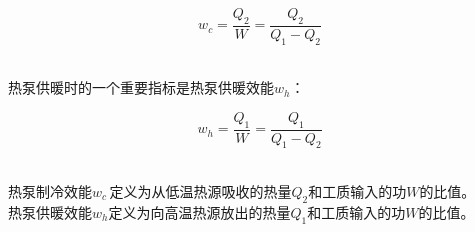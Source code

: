 \documentclass[UTF8]{ctexart}
\begin{document}
    \begin{large}
        \begin{equation*}
            w_c=\frac{Q_2}{W}=\frac{Q_2}{Q_1-Q_2}
        \end{equation*}
    \end{large}\\
    热泵供暖时的一个重要指标是热泵供暖效能$w_h$：
    \begin{large}
        \begin{equation*}
            w_h=\frac{Q_1}{W}=\frac{Q_1}{Q_1-Q_2}
        \end{equation*}
    \end{large}\\
    热泵制冷效能$w_c\,$定义为从低温热源吸收的热量$Q_2$和工质输入的功$W$的比值。\\[3mm]
    热泵供暖效能$w_h$定义为向高温热源放出的热量$Q_1$和工质输入的功$W$的比值。

\newpage
\end{document}
